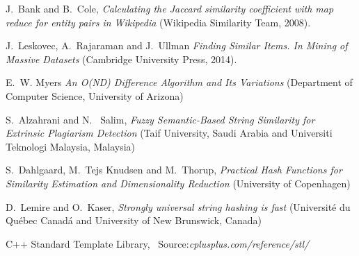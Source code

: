 \documentclass[12pt]{article}
\begin{document}
\begin{thebibliography}{100}

J.\ Bank and B.\ Cole,
\textit {Calculating the Jaccard similarity coefficient with map reduce for entity pairs in
Wikipedia} (Wikipedia Similarity Team, 2008).

J.\ Leskovec, A.\ Rajaraman and J.\ Ullman
\textit{ Finding Similar Items. In Mining of Massive Datasets} (Cambridge University Press, 2014).

E.\ W. Myers \textit{An O(ND) Difference Algorithm and Its Variations} (Department of Computer Science, University of Arizona)

S.\ Alzahrani and N. \ Salim, \textit{Fuzzy Semantic-Based String Similarity for Extrinsic Plagiarism Detection} (Taif University, Saudi Arabia and Universiti Teknologi Malaysia, Malaysia)

S.\ Dahlgaard, M.\ Tejs Knudsen and M.\ Thorup, \textit{Practical Hash Functions for Similarity Estimation and Dimensionality Reduction} (University of Copenhagen)

D.\ Lemire and O.\ Kaser, \textit{Strongly universal string hashing is fast} (Université du Québec Canadá and University of New Brunswick, Canada) 

C++ Standard Template Library,
\ Source:\textit{cplusplus.com/reference/stl/}

\end{thebibliography}
\end{document}
